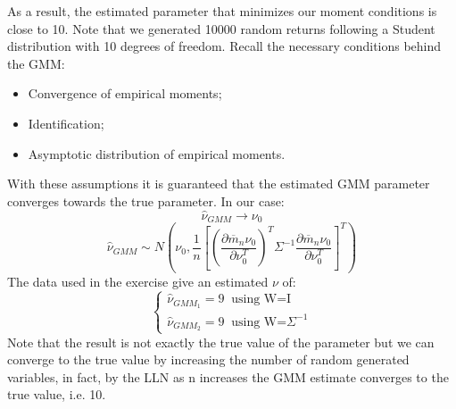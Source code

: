 \newpage
As a result, the estimated parameter that minimizes our moment conditions is close to 10. Note that we generated 10000 random returns following a Student distribution with 10 degrees of freedom. Recall the necessary conditions behind the GMM:
\begin{itemize}
    \item Convergence of empirical moments;
    \item Identification;
    \item Asymptotic distribution of empirical moments.
\end{itemize}
With these assumptions it is guaranteed that the estimated GMM parameter converges towards the true parameter. In our case:
\begin{equation*}
        \widehat{\nu}_{GMM} \to \nu_0
\end{equation*}
\begin{equation*}
        \widehat{\nu}_{GMM} \sim N(\nu_0,
        \frac{1}{n}[(\frac{\partial\overline{m}_n\nu_0}{\partial\nu_0^T})^T\Sigma^{-1}\frac{\partial\overline{m}_n\nu_0}{\partial\nu_0^T}]^T)
\end{equation*}
The data used in the exercise give an estimated $\nu$ of:
\begin{equation*}
    \begin{cases}
    \widehat{\nu}_{GMM_{1}}=9 \;\;\text{using W=I}\\
    \widehat{\nu}_{GMM_{2}}=9 \;\;\text{using W=}\Sigma^{-1}
\end{cases}
\end{equation*}
Note that the result is not exactly the true value of the parameter but we can converge to the true value by increasing the number of random generated variables, in fact, by the LLN as n increases the GMM estimate converges to the true value, i.e. 10.

